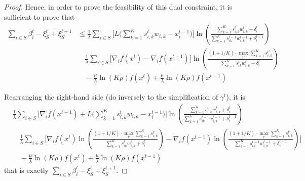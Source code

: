 \begin{proof}
Hence, in order to prove the feasibility of this dual constraint, it is sufficient to prove that
\begin{align*}
\sum_{i \in S}\beta_{i}^{t} - \xi_{S}^{t} + \xi_{S}^{t+1}  &\leq     \frac{1}{\lambda} \sum_{i \in S} \biggl[ L\biggl( \sum_{k=1}^{K} s_{i,k}^{t} w_{i,k}  - x_{i}^{t-1} \biggr) \biggr]  \ln \left( \frac{\sum_{k=1}^{K} s_{i,k}^{t} w_{i,k}^{t} + \delta_{i}^{t}}{\sum_{k=1}^{K}  s_{ik}^{t-1}w_{i,k}^{t-1}  + \delta_{i}^{t-1}} \right) \\
        & \quad  \frac{1}{\lambda} \sum_{i \in S} \biggl[ \nabla_{i} f(x^{t}) - \nabla_{i} f(x^{t-1}) \biggr] \ln \left( \frac{(1 + 1/K) \cdot \max_{t'} \sum_{k=1}^{K} s_{i,k}^{t'}}{\sum_{k=1}^{K}  s_{ik}^{t}w_{i,k}^{t}  + \delta_{i}^{t}} \right)  \\
    & \quad - \frac{\mu}{\lambda} \ln(K\rho) f(x^{t}) + \frac{\mu}{\lambda} \ln(K\rho) f(x^{t-1})
\end{align*}

Rearranging the right-hand side (do inversely to the simplification of $\gamma^{t}$), it is
\begin{align*}
&\frac{1}{\lambda} \sum_{i \in S} \biggl[  \nabla_{i} f(x^{t-1}) + L\biggl( \sum_{k=1}^{K} s_{i,k}^{t} w_{i,k}  - x_{i}^{t-1} \biggr) \biggr]  \ln \left( \frac{\sum_{k=1}^{K} s_{i,k}^{t} w_{i,k}^{t} + \delta_{i}^{t}}{\sum_{k=1}^{K}  s_{ik}^{t-1}w_{i,k}^{t-1}  + \delta_{i}^{t-1}} \right) \\
        & \quad  \frac{1}{\lambda} \sum_{i \in S} \biggl[ \nabla_{i} f(x^{t}) \ln \left( \frac{(1 + 1/K) \cdot \max_{t'} \sum_{k=1}^{K} s_{i,k}^{t'}}{\sum_{k=1}^{K}  s_{ik}^{t}w_{i,k}^{t}  + \delta_{i}^{t}} \right) -  \nabla_{i} f(x^{t-1}) \ln \left( \frac{(1 + 1/K) \cdot \max_{t'} \sum_{k=1}^{K} s_{i,k}^{t'}}{\sum_{k=1}^{K}  s_{ik}^{t-1}w_{i,k}^{t-1}  + \delta_{i}^{t-1}} \right) \biggr] \\
    & \quad - \frac{\mu}{\lambda} \ln(K\rho) f(x^{t}) + \frac{\mu}{\lambda} \ln(K\rho) f(x^{t-1})
\end{align*}
that is exactly $\sum_{i \in S}\beta_{i}^{t} - \xi_{S}^{t} + \xi_{S}^{t+1}$.

\end{proof}


